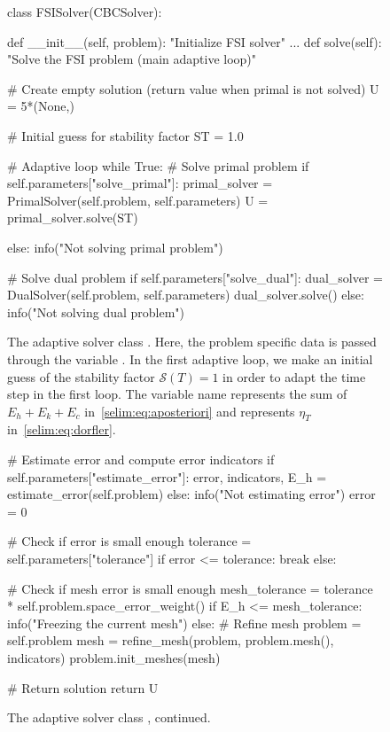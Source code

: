 \begin{figure}
  \caption{The adaptive solver class . Here, the
    problem specific data is passed through the variable . In
    the first adaptive loop, we make an initial guess of the stability
    factor $\mathcal{S}(T)=1$ in order to adapt the time step in the
    first loop.  The variable name  represents the sum of
    $E_h + E_k + E_c$ in~\eqref{selim:eq:aposteriori} and
     represents $\eta_T$ in~\eqref{selim:eq:dorfler}.}
\begin{python}[htbp!]
class FSISolver(CBCSolver):

    def __init__(self, problem):
        "Initialize FSI solver"
            ...
    def solve(self):
        "Solve the FSI problem (main adaptive loop)"

        # Create empty solution (return value when primal is not solved)
        U = 5*(None,)

        # Initial guess for stability factor
        ST = 1.0

        # Adaptive loop
        while True:
            # Solve primal problem
            if self.parameters["solve_primal"]:
                primal_solver = PrimalSolver(self.problem, self.parameters)
                U = primal_solver.solve(ST)

            else:
                info("Not solving primal problem")

            # Solve dual problem
            if self.parameters["solve_dual"]:
                dual_solver = DualSolver(self.problem, self.parameters)
                dual_solver.solve()
            else:
                info("Not solving dual problem")
\end{python}
\label{selim:fig:FSISolver-1}
\end{figure}

\begin{figure}[tbp!]
\caption{The adaptive solver class , continued.}
\begin{python}
            # Estimate error and compute error indicators
            if self.parameters["estimate_error"]:
                error, indicators, E_h = estimate_error(self.problem)
            else:
                info("Not estimating error")
                error = 0

            # Check if error is small enough
            tolerance = self.parameters["tolerance"]
            if error <= tolerance:
                break
            else:

            # Check if mesh error is small enough
            mesh_tolerance = tolerance * self.problem.space_error_weight()
            if E_h <= mesh_tolerance:
                info("Freezing the current mesh")
            else:
                # Refine mesh
                problem = self.problem
                mesh = refine_mesh(problem,
                                   problem.mesh(),
                                   indicators)
                problem.init_meshes(mesh)

        # Return solution
        return U
\end{python}
\label{selim:fig:FSISolver-2}
\end{figure}

